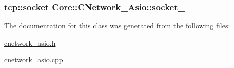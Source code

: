 \subsubsection[{\texorpdfstring{socket\+\_\+}{socket_}}]{\setlength{\rightskip}{0pt plus 5cm}tcp\+::socket Core\+::\+C\+Network\+\_\+\+Asio\+::socket\+\_\+\hspace{0.3cm}{\ttfamily [protected]}}\hypertarget{classCore_1_1CNetwork__Asio_a57eebf57efe1aa1728b3e3746cde10fb}{}\label{classCore_1_1CNetwork__Asio_a57eebf57efe1aa1728b3e3746cde10fb}


The documentation for this class was generated from the following files\+:\begin{DoxyCompactItemize}
\item 
\hyperlink{cnetwork__asio_8h}{cnetwork\+\_\+asio.\+h}\item 
\hyperlink{cnetwork__asio_8cpp}{cnetwork\+\_\+asio.\+cpp}\end{DoxyCompactItemize}
